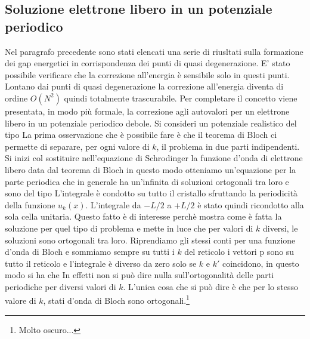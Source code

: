 \subsection{Soluzione elettrone libero in un potenziale periodico}
Nel paragrafo precedente sono stati elencati una serie di riusltati sulla formazione dei gap energetici in corrispondenza dei punti di quasi degenerazione. E' stato possibile verificare che la correzione all'energia è sensibile solo in questi punti. Lontano dai punti di quasi degenerazione la correzione all'energia diventa di ordine $O(N^2)$ quindi totalmente trascurabile. Per completare il concetto viene presentata, in modo più formale, la correzione agli autovalori per un elettrone libero in un potenziale periodico debole. Si consideri un potenziale realistico del tipo
La prima osservazione che è possibile fare è che il teorema di Bloch ci permette di separare, per ogni valore di $k$, il problema in due parti indipendenti. Si inizi col sostituire nell'equazione di Schrodinger la funzione d'onda di elettrone libero data dal teorema di Bloch
in questo modo otteniamo un'equazione per la parte periodica
che in generale ha un'infinita di soluzioni ortogonali tra loro e sono del tipo
L'integrale è condotto su tutto il cristallo sfruttando la periodicità della funzione $u_k(x)$. L'integrale da $-L/2$ a $+L/2$ è stato quindi ricondotto alla sola cella unitaria.
Questo fatto è di interesse perchè mostra come è fatta la soluzione per quel tipo di problema e mette in luce che per valori di $k$ diversi, le soluzioni sono ortogonali tra loro. Riprendiamo gli stessi conti per una funzione d'onda di Bloch e sommiamo sempre su tutti i $k$ del reticolo
i vettori p sono su tutto il reticolo e l'integrale è diverso da zero solo se $k$ e $k'$ coincidono, in questo modo si ha che
In effetti non si può dire nulla sull'ortogonalità delle parti periodiche per diversi valori di $k$. L'unica cosa che si può dire è che per lo stesso valore di $k$, stati d'onda  di Bloch sono ortogonali.\footnote{Molto oscuro...}
